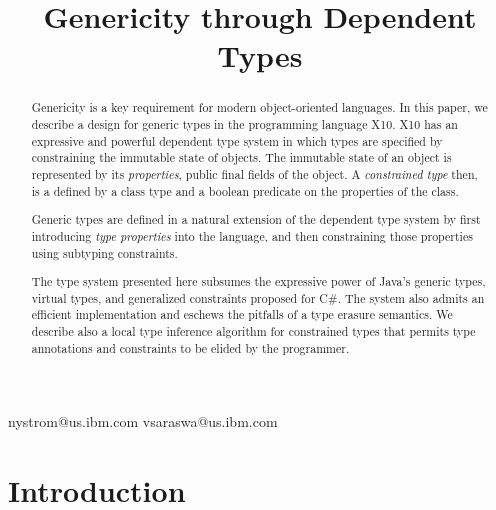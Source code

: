 \documentclass[nocopyrightspace,9pt]{sigplanconf}
\newif\iflncs
\begin{document}
\title{Genericity through Dependent Types}

\iflncs

\author{Nathaniel Nystom\inst{1} \and Vijay Saraswat\inst{1}}

\institute{IBM T.~J. Watson Research~Center, P.O.~Box~704, Yorktown~Heights NY 10598 USA,
\email{\{nystrom,vsaraswa\}@us.ibm.com}}

\else

  {nystrom@us.ibm.com}
  {vsaraswa@us.ibm.com}


\fi

\maketitle

\begin{abstract}
Genericity is a key requirement for modern object-oriented languages.
In this paper, we describe a design for generic types in the programming language X10.
X10 has an expressive and powerful dependent type system
in which types are specified by constraining the immutable state
of objects.
The immutable state of an object is represented by its
\emph{properties}, public final fields of the object.
A \emph{constrained type} then, is a defined by a class type and
a boolean predicate on the properties of the class.

Generic types are defined in a natural extension of the
dependent type system by first introducing \emph{type properties} into
the language, and then constraining those properties using
subtyping constraints.

The type system presented  here  subsumes the expressive power
of Java's generic types, virtual types,
and generalized constraints proposed for C\#.
The system also admits an efficient implementation 
and eschews the pitfalls of a type erasure semantics.
We describe also a local type inference algorithm for constrained
types that permits type annotations and constraints to be elided
by the programmer.
\end{abstract}

\section{Introduction}
\end{document}
